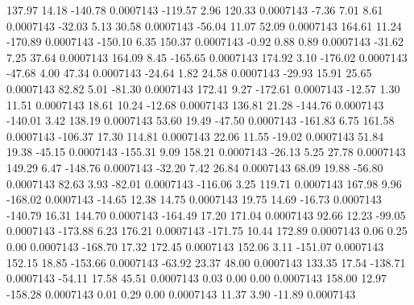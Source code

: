       137.97       14.18     -140.78     0.0007143
     -119.57        2.96      120.33     0.0007143
       -7.36        7.01        8.61     0.0007143
      -32.03        5.13       30.58     0.0007143
      -56.04       11.07       52.09     0.0007143
      164.61       11.24     -170.89     0.0007143
     -150.10        6.35      150.37     0.0007143
       -0.92        0.88        0.89     0.0007143
      -31.62        7.25       37.64     0.0007143
      164.09        8.45     -165.65     0.0007143
      174.92        3.10     -176.02     0.0007143
      -47.68        4.00       47.34     0.0007143
      -24.64        1.82       24.58     0.0007143
      -29.93       15.91       25.65     0.0007143
       82.82        5.01      -81.30     0.0007143
      172.41        9.27     -172.61     0.0007143
      -12.57        1.30       11.51     0.0007143
       18.61       10.24      -12.68     0.0007143
      136.81       21.28     -144.76     0.0007143
     -140.01        3.42      138.19     0.0007143
       53.60       19.49      -47.50     0.0007143
     -161.83        6.75      161.58     0.0007143
     -106.37       17.30      114.81     0.0007143
       22.06       11.55      -19.02     0.0007143
       51.84       19.38      -45.15     0.0007143
     -155.31        9.09      158.21     0.0007143
      -26.13        5.25       27.78     0.0007143
      149.29        6.47     -148.76     0.0007143
      -32.20        7.42       26.84     0.0007143
       68.09       19.88      -56.80     0.0007143
       82.63        3.93      -82.01     0.0007143
     -116.06        3.25      119.71     0.0007143
      167.98        9.96     -168.02     0.0007143
      -14.65       12.38       14.75     0.0007143
       19.75       14.69      -16.73     0.0007143
     -140.79       16.31      144.70     0.0007143
     -164.49       17.20      171.04     0.0007143
       92.66       12.23      -99.05     0.0007143
     -173.88        6.23      176.21     0.0007143
     -171.75       10.44      172.89     0.0007143
        0.06        0.25        0.00     0.0007143
     -168.70       17.32      172.45     0.0007143
      152.06        3.11     -151.07     0.0007143
      152.15       18.85     -153.66     0.0007143
      -63.92       23.37       48.00     0.0007143
      133.35       17.54     -138.71     0.0007143
      -54.11       17.58       45.51     0.0007143
        0.03        0.00        0.00     0.0007143
      158.00       12.97     -158.28     0.0007143
        0.01        0.29        0.00     0.0007143
       11.37        3.90      -11.89     0.0007143
